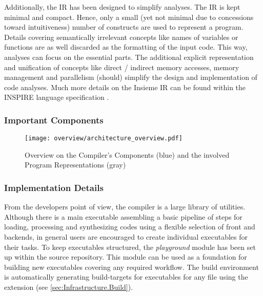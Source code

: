 Additionally, the IR has been designed to simplify analyses. The IR is kept
minimal and compact. Hence, only a small (yet not minimal due to concessions
toward intuitiveness) number of constructs are used to represent a program.
Details covering semantically irrelevant concepts like names of variables or
functions are as well discarded as the formatting of the input code. This way,
analyses can focus on the essential parts. The additional explicit
representation and unification of concepts like direct / indirect memory
accesses, memory management and parallelism (should) simplify the design and
implementation of code analyses.  Much more details on the Insieme IR can be found within
the INSPIRE language specification \cite{insieme_ir_spec}.


\subsubsection{Important Components}

\begin{figure}[tb]
	\centering
	\texttt{[image: overview/architecture\_overview.pdf]}
	\caption{Overview on the Compiler's Components (blue) and the involved Program Representations (gray)}
	\label{fig:Overview.Compiler.Components}
\end{figure}


\subsubsection{Implementation Details}
From the developers point of view, the compiler is a large library of utilities.
Although there is a main executable assembling a basic pipeline of steps for
loading, processing and synthesizing codes using a flexible selection of front
and backends, in general users are encouraged to create individual executables
for their tasks. To keep executables structured, the \textit{playground} module
has been set up within the source repository. This module can be used as a
foundation for building new executables covering any required workflow. The
build environment is automatically generating build-targets for executables for
any file using the  extension (see \ref{sec:Infrastructure.Build}).

